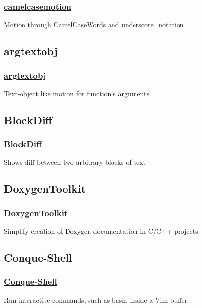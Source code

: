 \documentclass[14pt,svgnames,compress]{beamer}
\newcommand\hl[1]{\textcolor{HlColor}{#1}}
\begin{document}
\begin{frame}
    \frametitle{
        \href{https://github.com/vim-scripts/camelcasemotion}
             {camelcasemotion}
    }
    \large
    Motion through \hl{CamelCaseWords} and \hl{underscore\_notation} \\
\end{frame}


\subsection{argtextobj}

\begin{frame}
    \frametitle{
        \href{http://github.com/vim-scripts/argtextobj.vim}
             {argtextobj}
    }
    \large
    Text-object like motion for function's arguments \\
\end{frame}


\subsection{BlockDiff}

\begin{frame}
    \frametitle{
        \href{http://github.com/vim-scripts/BlockDiff}
             {BlockDiff}
    }
    \large
    Shows diff between two arbitrary blocks of text \\
\end{frame}


\subsection{DoxygenToolkit}

\begin{frame}
    \frametitle{
        \href{http://github.com/vim-scripts/DoxygenToolkit.vim}
             {DoxygenToolkit}
    }
    \large
    Simplify creation of Doxygen documentation in C/C++ projects \\
\end{frame}


\subsection{Conque-Shell}

\begin{frame}
    \frametitle{
        \href{http://github.com/vim-scripts/Conque-Shell}
             {Conque-Shell}
    }
    \large
    Run interactive commands, such as \hl{bash}, inside a Vim buffer \\
\end{frame}
\end{document}
